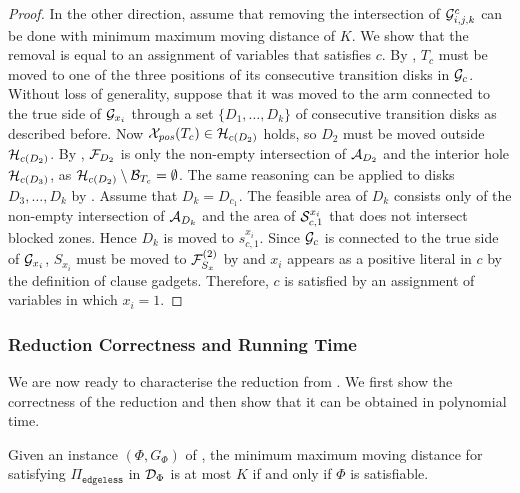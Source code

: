 \begin{toappendix}
\begin{toappendix}
\begin{proof}
    In the other direction, assume that removing the intersection of $\G^c_{i,j,k}$ can be done with minimum maximum moving distance of $K$.
    We show that the removal is equal to an assignment of variables that satisfies $c$.
    By , $T_c$ must be moved to one of the three positions of its consecutive transition disks in $\G_c$.
    Without loss of generality, suppose that it was moved to the arm connected to the true side of $\G_{x_i}$ through a set $\{D_1,\ldots,D_k\}$ of consecutive transition disks as described before.
    Now $\movedpos{T_c} \in \H_{c(D_2)}$ holds, so $D_2$ must be moved outside $\H_{c(D_2)}$.
    By , $\F_{D_2}$ is only the non-empty intersection of $\A_{D_2}$ and the interior hole $\H_{c(D_3)}$, as $\H_{c(D_2)} \setminus \B_{T_c} = \emptyset$.
    The same reasoning can be applied to disks $D_{3},\ldots,D_{k}$ by .
    Assume that $D_k = D_{c_1}$.
    The feasible area of $D_k$ consists only of the non-empty intersection of $\A_{D_k}$ and the area of $\S^{x_i}_{c,1}$ that does not intersect blocked zones.
    Hence $D_k$ is moved to $s^{x_i}_{c,1}$.
    Since $\G_c$ is connected to the true side of $\G_{x_i}$, $S_{x_i}$ must be moved to $\F_{S_x}^{(2)}$ by  and $x_i$ appears as a positive literal in $c$ by the definition of clause gadgets.
    Therefore, $c$ is satisfied by an assignment of variables in which $x_i = 1$.
\end{proof}

\subsubsection{Reduction Correctness and Running Time}

We are now ready to characterise the reduction from {\pthreesat}. We first show the correctness of the reduction and then show that it can be obtained in polynomial time.

\begin{mlemmarep}\label{lem:3sat_edgeless_equiv}
    Given an instance $(\Phi,G_\Phi)$ of {\pthreesat}, the minimum maximum moving distance for satisfying $\Pi_{\texttt{edgeless}}$ in $\cstate$ is at most $K$ if and only if $\Phi$ is satisfiable.
\end{mlemmarep}


\end{toappendix}
\end{toappendix}
